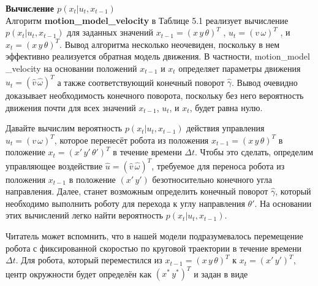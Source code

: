 \documentclass[10pt,a4paper]{article}
\begin{document}
\textbf{Вычисление $p(x_t | u_t, x_{t-1})$}\\

Алгоритм \textbf{motion\_model\_velocity} в Таблице 5.1 реализует вычисление $p(x_t | u_t, x_{t-1})$ для заданных значений $x_{t-1} = (x\,y\,\theta)^T$ , $u_t = (v\,\omega)^T$ , и $x_t = (x\,y\,\theta)^T$. Вывод алгоритма несколько неочевиден, поскольку в нем эффективно реализуется обратная модель движения. В частности, motion\_model \_velocity на основании положений $x_{t-1}$ и $x_t$ определяет параметры движения $\hat{u}_t=(\hat{v}\,\hat{\omega})^T$ а также соответствующий конечный поворот $\hat{\gamma}$. Вывод очевидно доказывает необходимость конечного поворота, поскольку без него вероятность движения почти для всех значений $x_{t-1}$, $u_t$, и $x_t$, будет равна нулю. 

Давайте вычислим вероятность $p(x_t | u_t, x_{t-1})$ действия управления $u_t = (v\,\omega)^T$,
которое перенесёт робота из положения $x_{t-1} = (x\,y\,\theta)^T$ в положение $x_t = (x'\,y'\,\theta')^T$
в течение времени $\varDelta t$. Чтобы это сделать, определим управляющее воздействие $\hat{u}=(\hat{v}\,\hat{\omega})^T$, требуемое для переноса робота из положения $x_{t-1}$ в положение $(x'\,y')$ безотносительно конечного угла направления. Далее, станет возможным определить конечный поворот 
$\hat{\gamma}$, который необходимо выполнить роботу для перехода к углу направления $\theta'$. На основании этих вычислений легко найти вероятность $p(x_t | u_t, x_{t-1})$.

Читатель может вспомнить, что в нашей модели подразумевалось перемещение робота с фиксированной скоростью по круговой траектории в течение времени $\varDelta t$. Для робота, который переместился из $x_{t-1} = (x\,y\,\theta)^T$ к $x_t = (x'\,y')^T$, центр окружности будет определён как $(x^*\,y^*)^T$ и задан в виде\\
\end{document}
